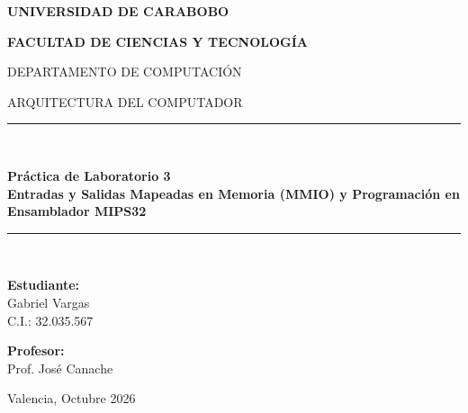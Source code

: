 \documentclass[12pt, letterpaper]{article}
\begin{document}
\begin{titlepage}
    \centering
    {\bfseries\Large UNIVERSIDAD DE CARABOBO\par}
    \vspace{0.3cm}
    {\bfseries\large FACULTAD DE CIENCIAS Y TECNOLOGÍA\par}
    {\large DEPARTAMENTO DE COMPUTACIÓN\par}
    {\large ARQUITECTURA DEL COMPUTADOR\par}
    
    \vspace{2.5cm}
    
    \rule{\linewidth}{0.5mm} \\[0.4cm]
    {\huge\bfseries Práctica de Laboratorio 3 \\[0.3cm]
    \Large Entradas y Salidas Mapeadas en Memoria (MMIO) y Programación en Ensamblador MIPS32 \par}
    \rule{\linewidth}{0.5mm} \\[1.5cm]
    
    \vfill
    
    \begin{minipage}{0.48\textwidth}
        \begin{flushleft} \large
            \textbf{Estudiante:}\\
            Gabriel Vargas\\
            C.I.: 32.035.567
        \end{flushleft}
    \end{minipage}
    \hfill
    \begin{minipage}{0.48\textwidth}
        \begin{flushright} \large
            \textbf{Profesor:}\\
            Prof. José Canache
        \end{flushright}
    \end{minipage}
    
    \vfill
    \vspace{2cm}
    
    {\large Valencia, Octubre 2026 \par}
\end{titlepage}

\newpage

\end{document}
